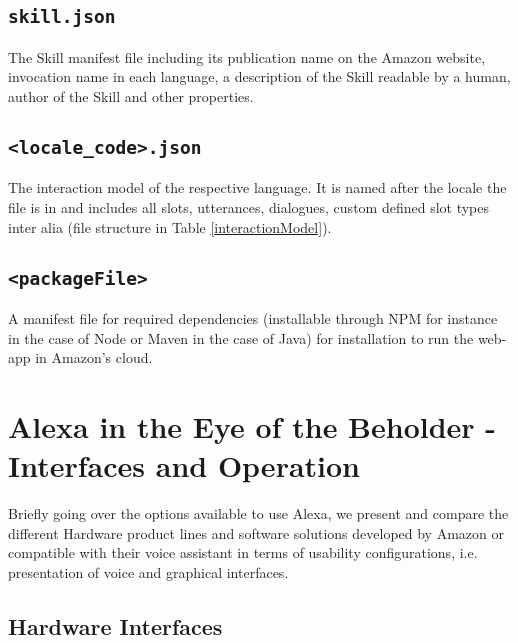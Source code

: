 \subsection*{\texttt{skill.json}}
The Skill manifest file including its publication name on the Amazon website, invocation name in each language, a description of the Skill readable by a human, author of the Skill and other properties.

\subsection*{\texttt{<locale_code>.json}}
The interaction model of the respective language. It is named after the locale the file is in and includes all slots, utterances, dialogues, custom defined slot types inter alia (file structure in Table \ref{interactionModel}).

\subsection*{\texttt{<packageFile>}}
A manifest file for required dependencies (installable through NPM for instance in the case of Node or Maven in the case of Java) for installation to run the web-app in Amazon's cloud.




\section[Alexa in the Eye of the Beholder]{Alexa in the Eye of the Beholder - \\Interfaces and Operation}
\label{testdevices}

Briefly going over the options available to use Alexa, we present and compare the different Hardware product lines and software solutions developed by Amazon or compatible with their voice assistant in terms of usability configurations, i.e. presentation of voice and graphical interfaces.

\subsection*{Hardware Interfaces}

